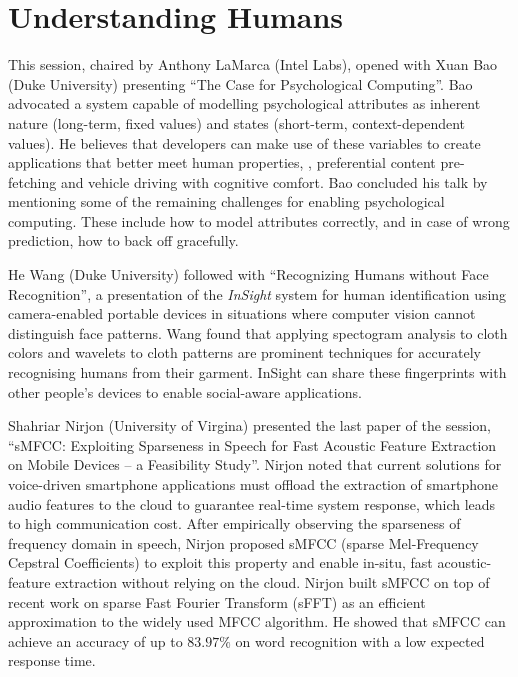 \section{Understanding Humans}
\label{sec:humans}

This session, chaired by Anthony LaMarca (Intel Labs), opened with Xuan
Bao (Duke University) presenting ``The Case for Psychological
Computing''. Bao advocated a system capable of modelling psychological
attributes as inherent nature (long-term, fixed values) and states
(short-term, context-dependent values). He believes that developers can
make use of these variables to create applications that better meet
human properties, \eg, preferential content pre-fetching and vehicle
driving with cognitive comfort. Bao concluded his talk by mentioning
some of the remaining challenges for enabling psychological computing.
These include how to model attributes correctly, and in case of wrong
prediction, how to back off gracefully.

He Wang (Duke University) followed with ``Recognizing Humans without Face
Recognition'', a presentation of the \emph{InSight} system for human
identification using camera-enabled portable devices in situations where
computer vision cannot distinguish face patterns. Wang found that
applying spectogram analysis to cloth colors and wavelets to cloth
patterns are prominent techniques for accurately recognising humans from
their garment. InSight can share these fingerprints with other people's
devices to enable social-aware applications.

Shahriar Nirjon (University of Virgina) presented the last paper of
the session, ``sMFCC: Exploiting Sparseness in Speech for Fast Acoustic
Feature Extraction on Mobile Devices -- a Feasibility Study''. Nirjon
noted that current solutions for voice-driven smartphone applications
must offload the extraction of smartphone audio features to the cloud to
guarantee real-time system response, which leads to high communication
cost. After empirically observing the sparseness of frequency domain in
speech, Nirjon proposed sMFCC (sparse Mel-Frequency Cepstral
Coefficients) to exploit this property and enable in-situ, fast
acoustic-feature extraction without relying on the cloud. Nirjon built
sMFCC on top of recent work on sparse Fast Fourier Transform (sFFT) as
an efficient approximation to the widely used MFCC algorithm. He showed
that sMFCC can achieve an accuracy of up to $83.97\%$ on word
recognition with a low expected response time.
